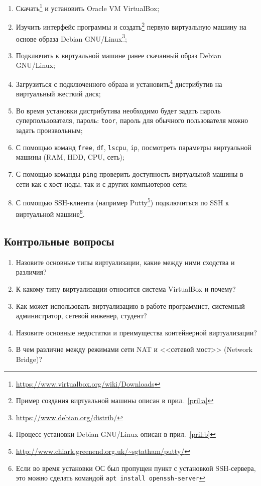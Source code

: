 \begin{enumerate}
    \item Скачать\footnote{\url{https://www.virtualbox.org/wiki/Downloads}} и установить Oracle VM VirtualBox;
    \item Изучить интерфейс программы и создать\footnote{Пример создания виртуальной машины описан в прил.~\ref{pril:a}} первую виртуальную машину на основе образа Debian GNU/Linux\footnote{\url{https://www.debian.org/distrib/}};
    \item Подключить к виртуальной машине ранее скачанный образ Debian GNU/Linux;
    \item Загрузиться с подключенного образа и установить\footnote{Процесс установки Debian GNU/Linux описан в прил.~\ref{pril:b}} дистрибутив на виртуальный жесткий диск;
    \item Во время установки дистрибутива необходимо будет задать пароль суперпользователя, пароль: \texttt{toor}, пароль для обычного пользователя можно задать произвольным;
    \item С помощью команд \texttt{free}, \texttt{df}, \texttt{lscpu}, \texttt{ip}, посмотреть параметры виртуальной машины (RAM, HDD, CPU, сеть);
    \item С помощью команды \texttt{ping} проверить доступность виртуальной машины в сети как с хост-ноды, так и с других компьютеров сети;
    \item С помощью SSH-клиента (например Putty\footnote{\url{http://www.chiark.greenend.org.uk/~sgtatham/putty/}}) подключиться по SSH к виртуальной машине\footnote{Если во время установки ОС был пропущен пункт с установкой SSH-сервера, это можно сделать командой \texttt{apt install openssh-server}}.
\end{enumerate}

\subsection{Контрольные вопросы}
\begin{enumerate}
    \item Назовите основные типы виртуализации, какие между ними сходства и различия?
    \item К какому типу виртуализации относится система VirtualBox и почему?
    \item Как может использовать виртуализацию в работе программист, системный администратор, сетевой инженер, студент?
    \item Назовите основные недостатки и преимущества контейнерной виртуализации?
    \item В чем различие между режимами сети NAT и <<сетевой мост>> (Network Bridge)?
\end{enumerate}

\clearpage

